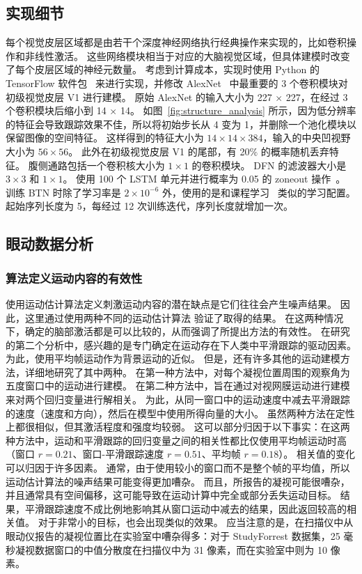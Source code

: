 \subsection{实现细节}
每个视觉皮层区域都是由若干个深度神经网络执行经典操作来实现的，比如卷积操作和非线性激活。
这些网络模块相当于对应的大脑视觉区域，但具体建模时改变了每个皮层区域的神经元数量。
考虑到计算成本，实现时使用 Python 的 TensorFlow 软件包~\cite{abadi2015tensorflow} 来进行实现，并修改 AlexNet~\cite{imagenet} 中最重要的 3 个卷积模块对初级视觉皮层 V1 进行建模。
原始 AlexNet 的输入大小为 227 $\times$ 227，在经过 3 个卷积模块后缩小到 14 $\times$ 14。
如图~\ref{fig:structure_analysis} 所示，因为低分辨率的特征会导致跟踪效果不佳，所以将初始步长从 4 变为 1，并删除一个池化模块以保留图像的空间特征。
这样得到的特征大小为 $14\times 14\times 384$，输入的中央凹视野大小为 $56\times 56$。
此外在初级视觉皮层 V1 的尾部，有 20$\%$ 的概率随机丢弃特征。
腹侧通路包括一个卷积核大小为 $1\times 1$ 的卷积模块。
DFN 的滤波器大小是 $3\times 3$ 和 $1\times 1$。
使用 100 个 LSTM 单元并进行概率为 0.05 的 zoneout 操作~\cite{zoneout}。
训练 BTN 时除了学习率是 $2 \times 10 ^{-6}$ 外，使用的是和课程学习~\cite{curriculum} 类似的学习配置。
起始序列长度为 5，每经过 12 次训练迭代，序列长度就增加一次。


\subsection{眼动数据分析}

\subsubsection{算法定义运动内容的有效性}
使用运动估计算法定义刺激运动内容的潜在缺点是它们往往会产生噪声结果。 
因此，这里通过使用两种不同的运动估计算法\cite{barth2000the,epicflow} 验证了取得的结果。 
在这两种情况下，确定的脑部激活都是可以比较的，从而强调了所提出方法的有效性。 
在研究的第二个分析中，感兴趣的是专门确定在运动存在下人类中平滑跟踪的驱动因素。
为此，使用平均帧运动作为背景运动的近似。
但是，还有许多其他的运动建模方法，详细地研究了其中两种。 
在第一种方法中，对每个凝视位置周围的观察角为五度窗口中的运动进行建模。 
在第二种方法中，旨在通过对视网膜运动进行建模来对两个回归变量进行解相关。
为此，从同一窗口中的运动速度中减去平滑跟踪的速度（速度和方向），然后在模型中使用所得向量的大小。 
虽然两种方法在定性上都很相似，但其激活程度和强度均较弱。 
这可以部分归因于以下事实：在这两种方法中，运动和平滑跟踪的回归变量之间的相关性都比仅使用平均帧运动时高（窗口 $r=0.21$、窗口-平滑跟踪速度 $r=0.51$、平均帧 $r =0.18$）。 
相关值的变化可以归因于许多因素。
通常，由于使用较小的窗口而不是整个帧的平均值，所以运动估计算法的噪声结果可能变得更加嘈杂。 
而且，所报告的凝视可能很嘈杂，并且通常具有空间偏移，这可能导致在运动计算中完全或部分丢失运动目标。 
结果，平滑跟踪速度不成比例地影响其从窗口运动中减去的结果，因此返回较高的相关值。 
对于非常小的目标，也会出现类似的效果。 
应当注意的是，在扫描仪中从眼动仪报告的凝视位置比在实验室中嘈杂得多：对于 StudyForrest 数据集，25 毫秒凝视数据窗口的中值分散度在扫描仪中为 31 像素，而在实验室中则为 10 像素。


